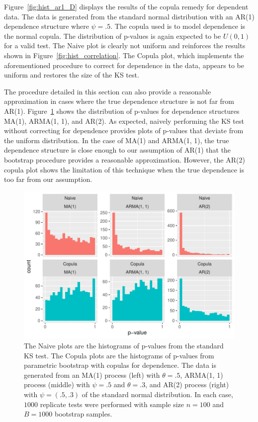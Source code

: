 \documentclass[12pt, letterpaper, titlepage]{article}
\begin{document}
Figure~\ref{fig:hist_ar1_D} displays the results of the copula remedy for 
dependent data. The data is generated from the standard normal distribution with
an AR(1) dependence structure where $\psi = .5$. The copula used is to model 
dependence is the normal copula. The distribution of p-values is again expected
to be $U(0, 1)$ for a valid test. The Naive plot is clearly not uniform and 
reinforces the results shown in Figure~\ref{fig:hist_correlation}. The Copula 
plot, which implements the aforementioned procedure to correct for dependence
in the data, appears to be uniform and restores the size of the KS test.

The procedure detailed in this section can also provide a reasonable 
approximation in cases where the true dependence structure is not far from 
AR(1). Figure~\ref{fig:hist_ma1_arma_ar2_D} shows the distribution of p-values 
for dependence structures MA(1), ARMA(1, 1), and AR(2). As expected, 
naively performing the KS test without correcting for dependence provides plots 
of p-values that deviate from the uniform distribution. In the case of MA(1) 
and ARMA(1, 1), the true dependence structure is close enough to our 
assumption of AR(1) that the bootstrap procedure provides a reasonable 
approximation. However, the AR(2) copula plot shows the limitation of this 
technique when the true dependence is too far from our assumption.

\begin{figure}[tbp]
  \centering
  \includegraphics{hist_ma1_arma_ar2_D}
  \caption{The Naive plots are the histograms of p-values from the standard KS 
  test. The Copula plots are the histograms of p-values from parametric 
  bootstrap with copulas for dependence. The data is generated from an MA(1) 
  process (left) with $\theta = .5$, ARMA(1, 1) process (middle) with $\psi = 
  .5$ and $\theta = .3$, and AR(2) process (right) with $\psi = (.5, .3)$ of the 
  standard normal distribution. In each case, $1000$ replicate tests were 
  performed with sample size $n = 100$ and $B = 1000$ bootstrap samples.}
  \label{fig:hist_ma1_arma_ar2_D}
\end{figure}
\end{document}
